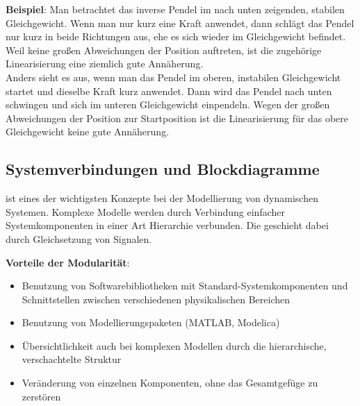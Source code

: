 \linie

\textbf{Beispiel}:
Man betrachtet das inverse Pendel im nach unten zeigenden, stabilen Gleichgewicht.
Wenn man nur kurz eine Kraft anwendet, dann schlägt das Pendel nur kurz in beide Richtungen
aus, ehe es sich wieder im Gleichgewicht befindet.
Weil keine großen Abweichungen der Position auftreten, ist die zugehörige Linearisierung eine
ziemlich gute Annäherung.\\
Anders sieht es aus, wenn man das Pendel im oberen, instabilen Gleichgewicht startet
und dieselbe Kraft kurz anwendet.
Dann wird das Pendel nach unten schwingen und sich im unteren Gleichgewicht einpendeln.
Wegen der großen Abweichungen der Position zur Startposition ist die Linearisierung für
das obere Gleichgewicht keine gute Annäherung.

\pagebreak

\subsection{%
    Systemverbindungen und Blockdiagramme%
}

 ist eines der wichtigsten Konzepte bei der Modellierung von
dynamischen Systemen.
Komplexe Modelle werden durch Verbindung einfacher Systemkomponenten in einer Art Hierarchie
verbunden.
Die  geschieht dabei durch Gleichsetzung von Signalen.

\textbf{Vorteile der Modularität}:
\begin{itemize}
    \item
    Benutzung von Softwarebibliotheken mit Standard-Systemkomponenten und
    Schnittstellen zwischen verschiedenen physikalischen Bereichen
    
    \item
    Benutzung von Modellierungspaketen (MATLAB, Modelica)
    
    \item
    Übersichtlichkeit auch bei komplexen Modellen durch die hierarchische, verschachtelte
    Struktur
    
    \item
    Veränderung von einzelnen Komponenten, ohne das Gesamtgefüge zu zerstören
\end{itemize}

\linie

